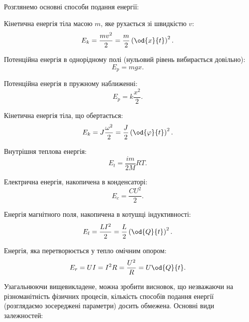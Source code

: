 \documentclass[a4paper,13pt]{atuaref}
\begin{document}
Розглянемо основні способи подання енергії:

Кінетична енергія тіла масою $m$, яке рухається зі швидкістю $v$:
%
\begin{equation}
  E_k = \frac{mv^2}{2} = \frac{m}{2} \left( \od{x}{t} \right)^2.
  \label{atu:eq:Ek_v}
\end{equation}
%

Потенційна енергія в однорідному полі (нульовий рівень вибирається довільно):
%
\begin{equation}
  E_p = m g x .
  \label{atu:eq:Ep_g}
\end{equation}

Потенційна енергія в пружному наближенні:
%
\begin{equation}
  E_p = k \frac{x^2}{2} .
  \label{atu:eq:Ep_spring}
\end{equation}

Кінетична енергія тіла, що обертається:
%
\begin{equation}
  E_k = J \frac{\omega^2}{2} = \frac{J}{2} \left( \od{\varphi}{t} \right)^2 .
  \label{atu:eq:Ek_spin}
\end{equation}

Внутрішня теплова енергія:
%
\begin{equation}
  E_t = \frac{im}{2M} RT.
  \label{atu:eq:Et}
\end{equation}

Електрична енергія, накопичена в конденсаторі:
%
\begin{equation}
  E_c = \frac{C U^2}{2}.
  \label{atu:eq:Ec}
\end{equation}

Енергія магнітного поля, накопичена в котушці індуктивності:
%
\begin{equation}
  E_l = \frac{L I^2}{2} = \frac{L}{2} \left( \od{Q}{t}\right)^2 .
  \label{atu:eq:El}
\end{equation}

Енергія, яка перетворюється у тепло омічним опором:
%
\begin{equation}
  E_r = U I = I^2 R = \frac{U^2}{R} = U \od{Q}{t} .
  \label{atu:eq:Er}
\end{equation}

Узагальнюючи вищевикладене, можна зробити висновок, що незважаючи на
різноманітність фізичних процесів, кількість способів подання енергії
(розглядаємо зосереджені параметри) досить обмежена. Основні види залежностей:
\end{document}
